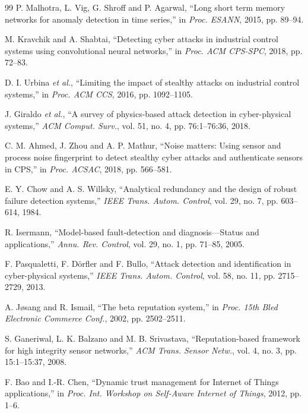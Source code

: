 \documentclass[conference]{IEEEtran}
\begin{document}
\begin{thebibliography}{99}
 P. Malhotra, L. Vig, G. Shroff and P. Agarwal, ``Long short term memory networks for anomaly detection in time series,'' in \emph{Proc. ESANN}, 2015, pp. 89--94.

 M. Kravchik and A. Shabtai, ``Detecting cyber attacks in industrial control systems using convolutional neural networks,'' in \emph{Proc. ACM CPS-SPC}, 2018, pp. 72--83.

 D. I. Urbina \emph{et al.}, ``Limiting the impact of stealthy attacks on industrial control systems,'' in \emph{Proc. ACM CCS}, 2016, pp. 1092--1105.

 J. Giraldo \emph{et al.}, ``A survey of physics-based attack detection in cyber-physical systems,'' \emph{ACM Comput. Surv.}, vol. 51, no. 4, pp. 76:1--76:36, 2018.

 C. M. Ahmed, J. Zhou and A. P. Mathur, ``Noise matters: Using sensor and process noise fingerprint to detect stealthy cyber attacks and authenticate sensors in CPS,'' in \emph{Proc. ACSAC}, 2018, pp. 566--581.

 E. Y. Chow and A. S. Willsky, ``Analytical redundancy and the design of robust failure detection systems,'' \emph{IEEE Trans. Autom. Control}, vol. 29, no. 7, pp. 603--614, 1984.

 R. Isermann, ``Model-based fault-detection and diagnosis---Status and applications,'' \emph{Annu. Rev. Control}, vol. 29, no. 1, pp. 71--85, 2005.

 F. Pasqualetti, F. D\"orfler and F. Bullo, ``Attack detection and identification in cyber-physical systems,'' \emph{IEEE Trans. Autom. Control}, vol. 58, no. 11, pp. 2715--2729, 2013.

 A. J{\o}sang and R. Ismail, ``The beta reputation system,'' in \emph{Proc. 15th Bled Electronic Commerce Conf.}, 2002, pp. 2502--2511.

 S. Ganeriwal, L. K. Balzano and M. B. Srivastava, ``Reputation-based framework for high integrity sensor networks,'' \emph{ACM Trans. Sensor Netw.}, vol. 4, no. 3, pp. 15:1--15:37, 2008.

 F. Bao and I.-R. Chen, ``Dynamic trust management for Internet of Things applications,'' in \emph{Proc. Int. Workshop on Self-Aware Internet of Things}, 2012, pp. 1--6.


\end{thebibliography}
\end{document}
